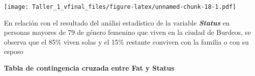 \documentclass[
]{article}
\newenvironment{Shaded}{\begin{snugshade}}{\end{snugshade}}
\newcommand{\AttributeTok}[1]{\textcolor[rgb]{0.77,0.63,0.00}{#1}}
\newcommand{\DecValTok}[1]{\textcolor[rgb]{0.00,0.00,0.81}{#1}}
\newcommand{\FunctionTok}[1]{\textcolor[rgb]{0.00,0.00,0.00}{#1}}
\newcommand{\NormalTok}[1]{#1}
\newcommand{\OtherTok}[1]{\textcolor[rgb]{0.56,0.35,0.01}{#1}}
\newcommand{\SpecialCharTok}[1]{\textcolor[rgb]{0.00,0.00,0.00}{#1}}
\newcommand{\StringTok}[1]{\textcolor[rgb]{0.31,0.60,0.02}{#1}}
\begin{document}
\begin{Shaded}
\end{Shaded}

\texttt{[image: Taller\_1\_vfinal\_files/figure-latex/unnamed-chunk-18-1.pdf]}

En relación con el resultado del análisi estadístico de la variable
\textbf{\emph{Status}} en personas mayores de 79 de género femenino que
viven en la ciudad de Burdeos, se observa que el 85\% viven solas y el
15\% restante conviven con la familia o con su esposo

\textbf{Tabla de contingencia cruzada entre Fat y Status}

\begin{Shaded}
\end{Shaded}
\end{document}
